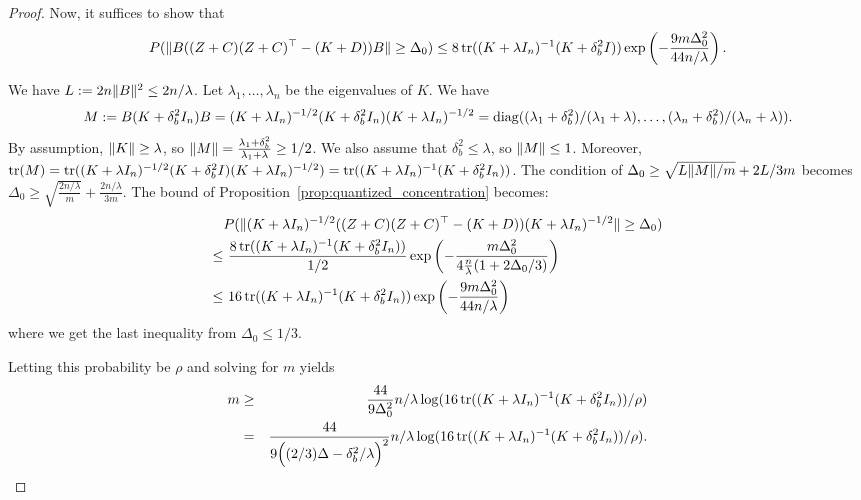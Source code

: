 \begin{proof}
Now, it suffices to show that
\begin{equation*}
P(\|B((Z + C)(Z + C)^\top - (K + D))B\| \geq \Delta_0) \leq 8 \mathop{\rm tr}((K + \lambda I_n)^{-1} (K +
\delta^2_b I)) \exp \left( -\frac{9m \Delta_0^2}{44n/\lambda} \right).
\end{equation*}

We have $L := 2n \|B\|^2 \leq 2n/\lambda$.
Let $\lambda_1, \dots, \lambda_n$ be the eigenvalues of $K$.
We have
\begin{equation*}
M \defeq B(K + \delta^2_b I_n) B =  (K + \lambda I_n)^{-1/2} (K + \delta^2_b I_n) (K + \lambda
I_n)^{-1/2} = \diag((\lambda_1 + \delta^2_b)/(\lambda_1 + \lambda), \dots,
(\lambda_n + \delta^2_b) / (\lambda_n + \lambda)).
\end{equation*}
By assumption, $\|K\| \geq \lambda$, so $\|M\| = \frac{\lambda_1 + \delta^2_b}{\lambda_1 + \lambda} \geq
1/2$.
We also assume that $\delta^2_b \leq \lambda$, so $\|M\| \leq 1$.
Moreover, $\mathop{\rm tr}(M) = \mathop{\rm tr}((K + \lambda I_n)^{-1/2} (K + \delta^2_b I) (K + \lambda I_n)^{-1/2}) =
\mathop{\rm tr}((K + \lambda I_n)^{-1} (K + \delta^2_b I_n))$.
The condition of $\Delta_0 \geq \sqrt{L \|M\| / m} + 2L/3m$ becomes $\Delta_0 \geq \sqrt{\frac{2n/\lambda}{m}} + \frac{2n/\lambda}{3m}$.
The bound of Proposition~\ref{prop:quantized_concentration} becomes:
\begin{align*}
&P(\|(K + \lambda I_n)^{-1/2} ((Z + C) (Z + C)^\top - (K + D)) (K + \lambda
  I_n)^{-1/2}\| \geq \Delta_0) \\
\leq&\ \frac{8 \mathop{\rm tr}((K + \lambda I_n)^{-1} (K + \delta^2_b I_n))}{1/2} \exp \left( -\frac{m
  \Delta_0^2}{4\frac{n}{\lambda} (1 + 2\Delta_0/3)} \right) \\
\leq&\ 16 \mathop{\rm tr}((K + \lambda I_n)^{-1} (K + \delta^2_b I_n)) \exp \left( -\frac{9m\Delta_0^2}{44n/\lambda} \right)
\end{align*}
where we get the last inequality from $\Delta_0 \leq 1/3$.

Letting this probability be $\rho$ and solving for $m$ yields
\begin{eqnarray*}
m &\geq& \frac{44}{9 \Delta_0^2} n/\lambda \log (16 \mathop{\rm tr}((K + \lambda I_n)^{-1} (K + \delta^2_b I_n)) / \rho) \\
&=& \frac{44}{9 \Big((2/3)\Delta - \delta_b^2/\lambda\Big)^2} n/\lambda \log (16 \mathop{\rm tr}((K + \lambda I_n)^{-1} (K + \delta^2_b I_n)) / \rho).
\end{eqnarray*}

\end{proof}

